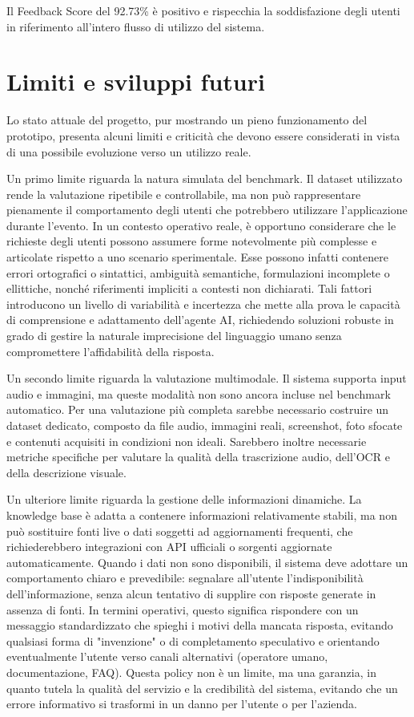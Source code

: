 Il Feedback Score del 92.73\% è positivo e rispecchia la soddisfazione degli utenti in riferimento all'intero flusso di utilizzo del sistema.

\section{Limiti e sviluppi futuri}

Lo stato attuale del progetto, pur mostrando un pieno funzionamento del prototipo, presenta alcuni limiti e criticità che devono essere considerati in vista di una possibile evoluzione verso un utilizzo reale.

Un primo limite riguarda la natura simulata del benchmark. Il dataset utilizzato rende la valutazione ripetibile e controllabile, ma non può rappresentare pienamente il comportamento degli utenti che potrebbero utilizzare l’applicazione durante l’evento. In un contesto operativo reale, è opportuno considerare che le richieste degli utenti possono assumere forme notevolmente più complesse e articolate rispetto a uno scenario sperimentale. Esse possono infatti contenere errori ortografici o sintattici, ambiguità semantiche, formulazioni incomplete o ellittiche, nonché riferimenti impliciti a contesti non dichiarati. Tali fattori introducono un livello di variabilità e incertezza che mette alla prova le capacità di comprensione e adattamento dell'agente AI, richiedendo soluzioni robuste in grado di gestire la naturale imprecisione del linguaggio umano senza compromettere l'affidabilità della risposta.

Un secondo limite riguarda la valutazione multimodale. Il sistema supporta input audio e immagini, ma queste modalità non sono ancora incluse nel benchmark automatico. Per una valutazione più completa sarebbe necessario costruire un dataset dedicato, composto da file audio, immagini reali, screenshot, foto sfocate e contenuti acquisiti in condizioni non ideali. Sarebbero inoltre necessarie metriche specifiche per valutare la qualità della trascrizione audio, dell’OCR e della descrizione visuale.

Un ulteriore limite riguarda la gestione delle informazioni dinamiche. La knowledge base è adatta a contenere informazioni relativamente stabili, ma non può sostituire fonti live o dati soggetti ad aggiornamenti frequenti, che richiederebbero integrazioni con API ufficiali o sorgenti aggiornate automaticamente. Quando i dati non sono disponibili, il sistema deve adottare un comportamento chiaro e prevedibile: segnalare all'utente l'indisponibilità dell'informazione, senza alcun tentativo di supplire con risposte generate in assenza di fonti. In termini operativi, questo significa rispondere con un messaggio standardizzato che spieghi i motivi della mancata risposta, evitando qualsiasi forma di "invenzione" o di completamento speculativo e orientando eventualmente l'utente verso canali alternativi (operatore umano, documentazione, FAQ).
Questa policy non è un limite, ma una garanzia, in quanto tutela la qualità del servizio e la credibilità del sistema, evitando che un errore informativo si trasformi in un danno per l'utente o per l'azienda.


